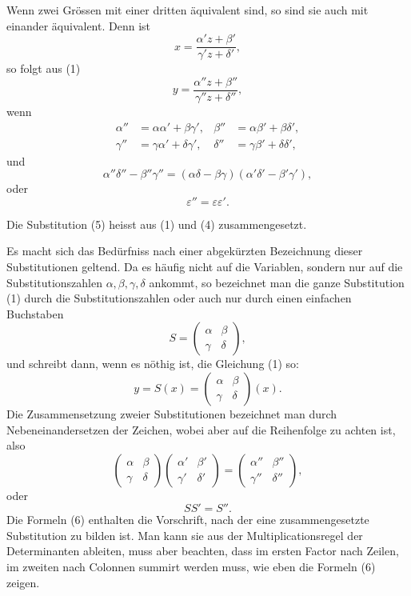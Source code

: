 \documentclass[11pt]{article}
\begin{document}
Wenn zwei Grössen mit einer dritten äquivalent sind, so sind sie auch mit einander äquivalent. Denn ist
\[
\tag{4}        x=\frac{\alpha' z+\beta'}{\gamma' z+\delta'},
\]
so folgt aus (1)
\[
\tag{5}        y=\frac{\alpha''z+\beta''}{\gamma''z+\delta''},
\]
wenn
\[
\tag{6}\begin{aligned}
\alpha''&=\alpha\alpha'+\beta\gamma',&
\beta''&=\alpha\beta'+\beta\delta',\\
\gamma''&=\gamma\alpha'+\delta\gamma',&
\delta''&=\gamma\beta'+\delta\delta',
\end{aligned}
\]
und
\[
\tag{7}        \alpha''\delta''-\beta''\gamma''
=(\alpha\delta-\beta\gamma)(\alpha'\delta'-\beta'\gamma'),
\]
oder
\[
\tag{8}        \varepsilon''=\varepsilon\varepsilon'.
\]

Die Substitution (5) heisst aus (1) und (4) zusammengesetzt.

Es macht sich das Bedürfniss nach einer abgekürzten Bezeichnung dieser Substitutionen geltend. Da es häufig nicht auf die Variablen, sondern nur auf die Substitutionszahlen $\alpha,\beta,\gamma,\delta$ ankommt, so bezeichnet man die ganze Substitution (1) durch die Substitutionszahlen oder auch nur durch einen einfachen Buchstaben
\[
\tag{9}        S=\begin{pmatrix}\alpha&\beta\\ \gamma&\delta\end{pmatrix},
\]
und schreibt dann, wenn es nöthig ist, die Gleichung (1) so:
\[
        y=S(x)=\begin{pmatrix}\alpha&\beta\\ \gamma&\delta\end{pmatrix}(x).
\]
Die Zusammensetzung zweier Substitutionen bezeichnet man durch Nebeneinandersetzen der Zeichen, wobei aber auf die Reihenfolge zu achten ist, also
\[
\tag{10}       \begin{pmatrix}\alpha&\beta\\ \gamma&\delta\end{pmatrix}
               \begin{pmatrix}\alpha'&\beta'\\ \gamma'&\delta'\end{pmatrix}
             = \begin{pmatrix}\alpha''&\beta''\\ \gamma''&\delta''\end{pmatrix},
\]
oder
\[
\tag{11}       SS'=S''.
\]
Die Formeln (6) enthalten die Vorschrift, nach der eine zusammengesetzte Substitution zu bilden ist. Man kann sie aus der Multiplicationsregel der Determinanten ableiten, muss aber beachten, dass im ersten Factor nach Zeilen, im zweiten nach Colonnen summirt werden muss, wie eben die Formeln (6) zeigen.
\end{document}
